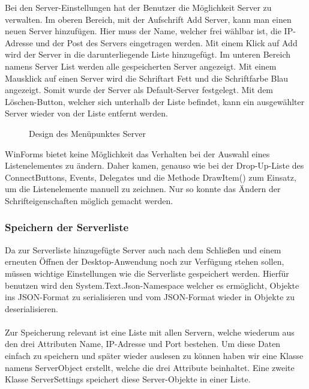 Bei den Server-Einstellungen hat der Benutzer die Möglichkeit Server zu verwalten.
Im oberen Bereich, mit der Aufschrift Add Server, kann man einen neuen Server hinzufügen. Hier muss der Name, welcher frei wählbar ist, die IP-Adresse und der Post des Servers eingetragen werden. Mit einem Klick auf Add wird der Server in die darunterliegende Liste hinzugefügt. Im unteren Bereich namens Server List werden alle gespeicherten Server angezeigt. Mit einem Mausklick auf einen Server wird die Schriftart Fett und die Schriftfarbe Blau angezeigt. Somit wurde der Server als Default-Server festgelegt. Mit dem Löschen-Button, welcher sich unterhalb der Liste befindet, kann ein ausgewählter Server wieder von der Liste entfernt werden.
\\
\begin{figure}[H]
    \centering
    \setlength{\fboxsep}{1pt}
	\setlength{\fboxrule}{1pt}
    \caption{Design des Menüpunktes Server} 
\end{figure}
\noindent
WinForms bietet keine Möglichkeit das Verhalten bei der Auswahl eines Listenelementes zu ändern. Daher kamen, genauso wie bei der Drop-Up-Liste des ConnectButtons, Events, Delegates und die Methode DrawItem() zum Einsatz, um die Listenelemente manuell zu zeichnen. Nur so konnte das Ändern der Schrifteigenschaften möglich gemacht werden.

\subsubsection{Speichern der Serverliste}
Da zur Serverliste hinzugefügte Server auch nach dem Schließen und einem erneuten Öffnen der Desktop-Anwendung noch zur Verfügung stehen sollen, müssen wichtige Einstellungen wie die Serverliste gespeichert werden. Hierfür benutzen wird den System.Text.Json-Namespace welcher es ermöglicht, Objekte ins JSON-Format zu serialisieren und vom JSON-Format wieder in Objekte zu deserialisieren.
\\ \ \\
Zur Speicherung relevant ist eine Liste mit allen Servern, welche wiederum aus den drei Attributen Name, IP-Adresse und Port bestehen. Um diese Daten einfach zu speichern und später wieder auslesen zu können haben wir eine Klasse namens ServerObject erstellt, welche die drei Attribute beinhaltet. Eine zweite Klasse ServerSettings speichert diese Server-Objekte in einer Liste.


